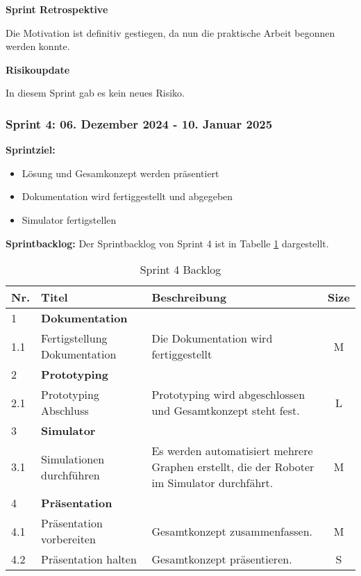 \textbf{Sprint Retrospektive}

Die Motivation ist definitiv gestiegen, da nun die praktische Arbeit begonnen werden konnte.

\textbf{Risikoupdate}

In diesem Sprint gab es kein neues Risiko.

\newpage
\subsubsection{Sprint 4: 06. Dezember 2024 - 10. Januar 2025}

\textbf{Sprintziel:}
\begin{itemize}
    \item Lösung und Gesamkonzept werden präsentiert
    \item Dokumentation wird fertiggestellt und abgegeben
    \item Simulator fertigstellen
\end{itemize}

\textbf{Sprintbacklog:} Der Sprintbacklog von Sprint 4 ist in Tabelle \ref{table:sprint4-backlog} dargestellt.

\begin{table}[H]
\centering
\small
\begin{tabularx}{\textwidth}{|l|l|X|c|}
\hline
  \textbf{Nr.} & \textbf{Titel} & \textbf{Beschreibung} & \textbf{Size}\\
  \hline
  1  & \textbf{Dokumentation} &&\\
  \hline
  1.1  & Fertigstellung Dokumentation & Die Dokumentation wird fertiggestellt & M\\
  \hline
  2 & \textbf{Prototyping} && \\
  \hline
  2.1 & Prototyping Abschluss & Prototyping wird abgeschlossen und Gesamtkonzept steht fest. & L \\
  \hline
  3 & \textbf{Simulator} && \\
  \hline
  3.1 & Simulationen durchführen & Es werden automatisiert mehrere Graphen erstellt, die der Roboter im Simulator durchfährt. & M\\
  \hline
  4 & \textbf{Präsentation} && \\
  \hline
  4.1 & Präsentation vorbereiten & Gesamtkonzept zusammenfassen. & M \\
  \hline
  4.2 &Präsentation halten & Gesamtkonzept präsentieren. & S \\
  \hline
\end{tabularx}
\caption{Sprint 4 Backlog}
\label{table:sprint4-backlog}
\end{table}

